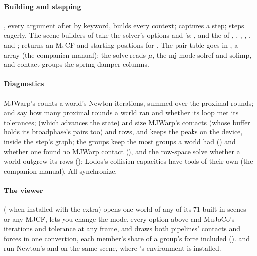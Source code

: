 \begin{sloppypar}
\paragraph{Building and stepping} , every argument after  by keyword, builds every context;  captures a step;  steps eagerly. The scene builders of  take the solver's options and 's: , and the  of , , , , ,  and ;  returns an MJCF and starting positions for . The pair table goes in , a  array (the companion manual): the solve reads $\mu$, the mj mode solref and solimp, and contact groups the spring-damper columns.
\end{sloppypar}

\paragraph{Diagnostics} MJWarp's  counts a world's Newton iterations, summed over the proximal rounds;  and  say how many proximal rounds a world ran and whether its loop met its tolerances;  (which advances the state) and  size MJWarp's contacts (whose buffer holds its broadphase's pairs too) and rows, and  keeps the peaks on the device, inside the step's graph; the groups keep the most groups a world had () and whether one found no MJWarp contact (), and the row-space solve whether a world outgrew its rows (); Lodos's collision capacities have tools of their own (the companion manual). All synchronize.

\paragraph{The viewer}  ( when installed with the  extra) opens one world of any of its 71 built-in scenes or any MJCF, lets you change the mode, every option above and MuJoCo's iterations and tolerance at any frame, and draws both pipelines' contacts and forces in one convention, each member's share of a group's force included ().  and  run Newton's  and  on the same scene, where 's environment is installed.

